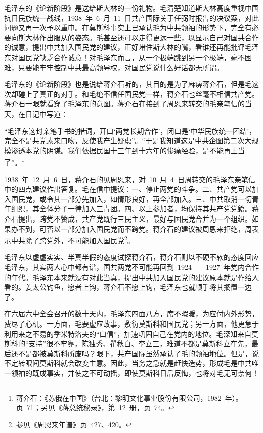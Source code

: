 毛泽东的《论新阶段》是送给斯大林的一份礼物。毛清楚知道斯大林高度重视中国抗日民族统一战线，1938~年~6~月~11~日共产国际关于任弼时报告的决议案，对此问题又再一次予以重申。在莫斯科事实上已承认毛为中共领袖的形势下，完全有必要向斯大林作出服从的姿态。毛甚至还可以走得更远一些，以显示自己对国共合作的诚意，提出中共加入国民党的建议，正好堵住斯大林的嘴，看谁还再能批评毛泽东对国民党缺乏合作诚意！对毛泽东而言，从一个极端跳到另一个极端，毫不困难，只要能牢牢控制中共最高领导权，对国民党说什么好话都无所谓。

毛泽东的《论新阶段》也是说给蒋介石听的，其目的是为了麻痹蒋介石，但是毛这次却碰上了真正的对手。和毛绝不信任国民党一样，蒋介石也丝毫不相信共产党。蒋介石一眼就看穿了毛泽东的意图。蒋介石在接到了周恩来转交的毛亲笔信的当天，在日记中写道：

“毛泽东这封亲笔手书的措词，开口‘两党长期合作’，闭口是‘中华民族统一团结’，完全不是共党素来口吻，反使我产生疑虑”。“于是我知道这是中共企图第二次大规模渗透本党的阴谋。我们依据民国十三年到十六年的惨痛经验，是不能再上当了”。\footnote{蒋介石：《苏俄在中国》（台北：黎明文化事业股份有限公司，1982~年）。页~71；另见《蒋总统秘录》，第~12~册，页~74。}

1938~年~12~月~6~日，蒋介石的见周恩来，对~10~月~4~日周转交的毛泽东亲笔信中的四点建议作出答复。毛在信中提议：一、停止两党的斗争。二、共产党可以加入国民党，或令其一部分先加入，如情形良好，再全部加入。三、中共取消一切青年组织，其全体分子一律加入三青团。四、以上参加者，均保持其共产党党籍。蒋介石提出，跨党不赞成，共产党既行三民主义，最好与国民党合并为一个组织。如果办不到，可否以一部分加入国民党而不跨党。蒋介石的建议被周恩来拒绝，周表示中共除了跨党外，不可能加入国民党\footnote{参见《周恩来年谱》页~427、420。}。

毛泽东以虚虚实实、半真半假的态度试探蒋介石，蒋介石则以不硬不软的态度回应毛泽东，其实两人心中都有谱，国共两党不可能再回到~1924~—~1927~年党内合作的年代。毛泽东本来就没有对此当真，提出中共加入国民党的建议原本就是作给人看的。姜太公钓鱼，愿者上钩，蒋介石不愿上钩，毛泽东也就顺手将其搁置一边了。

在六届六中全会召开的数十天内，毛泽东四面八方，席不暇暖，为应付内外形势，费尽了心机。一方面，毛要虚应故事，敷衍莫斯科和国民党；另一方面，他更急于利用来之不易的季米特洛夫的“口信”，加速巩固自己在党内的地位。毛深知来自莫斯科的“支持”很不牢靠，陈独秀、瞿秋白、李立三，难道不都是莫斯科立在先，最后还不是都被莫斯科所废吗？眼下，共产国际虽然承认了毛的领袖地位。但是，说不定转眼间莫斯科就会改变主意。因此，当务之急就是赶快造势，形成毛是中共唯一领袖的既成事实，并使之不可动摇，即使莫斯科日后反悔，也将对毛无可奈何！

